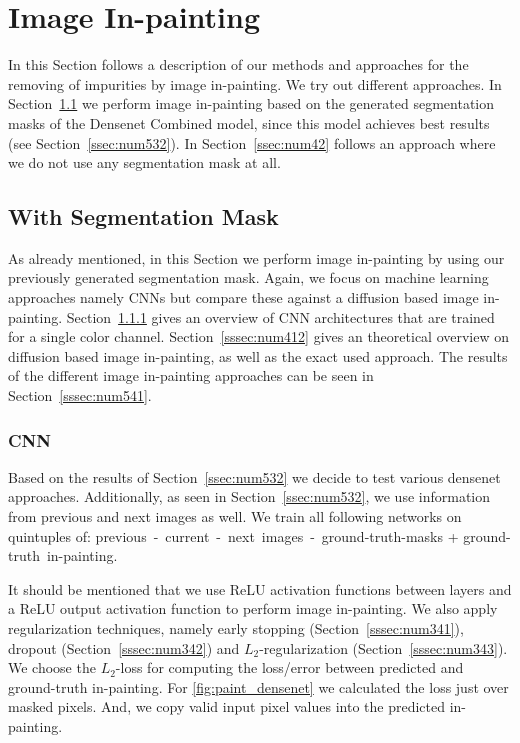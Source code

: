 \section{Image In-painting}
\label{sec:num4}

In this Section follows a description of our methods and approaches for the removing of impurities by image in-painting. We try out different approaches. In Section~\ref{ssec:num41} we perform image in-painting based on the generated segmentation masks of the Densenet Combined model, since this model achieves best results (see Section~\ref{ssec:num532}). In Section~\ref{ssec:num42} follows an approach where we do not use any segmentation mask at all. 

\subsection{With Segmentation Mask}
\label{ssec:num41}

As already mentioned, in this Section we perform image in-painting by using our previously generated segmentation mask. Again, we focus on machine learning approaches namely CNNs but compare these against a diffusion based image in-painting. Section~\ref{sssec:num411} gives an overview of CNN architectures that are trained for a single color channel. Section~\ref{sssec:num412} gives an theoretical overview on diffusion based image in-painting, as well as the exact used approach. 
The results of the different image in-painting approaches can be seen in Section~\ref{sssec:num541}.

\subsubsection{CNN}
\label{sssec:num411}

Based on the results of Section~\ref{ssec:num532} we decide to test various densenet approaches. Additionally, as seen in Section~\ref{ssec:num532}, we use information from previous and next images as well. We train all following networks on quintuples of: previous~-~current~-~next~images~-~ground-truth-masks + ground-truth~in-painting.


It should be mentioned that we use ReLU activation functions between layers and a ReLU output activation function to perform image in-painting. We also apply regularization techniques, namely early stopping (Section~\ref{sssec:num341}), dropout (Section~\ref{sssec:num342}) and $L_2$-regularization (Section~\ref{sssec:num343}). We choose the $L_2$-loss for computing the loss/error between predicted and ground-truth in-painting.  For \ref{fig:paint_densenet} we calculated the loss just over masked pixels. And, we copy valid input pixel values into the predicted in-painting.

